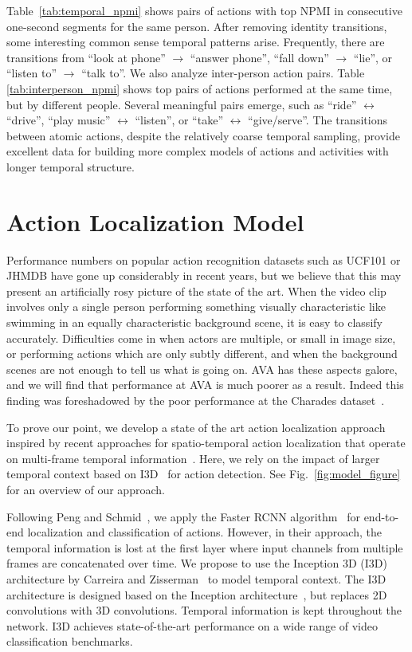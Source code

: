 \documentclass[10pt,twocolumn,letterpaper]{article}
\begin{document}
Table~\ref{tab:temporal_npmi} shows pairs of actions with top NPMI in consecutive one-second segments for the same person. After removing identity transitions, some interesting common sense temporal patterns arise. Frequently, there are transitions from ``look at phone''  $\rightarrow$ ``answer phone'', ``fall down''  $\rightarrow$ ``lie'', or ``listen to''  $\rightarrow$ ``talk to''.  We also analyze inter-person action pairs. Table \ref{tab:interperson_npmi} shows top pairs of actions performed at the same time, but by different people. Several meaningful pairs emerge, such as ``ride'' $\leftrightarrow$ ``drive'', ``play music'' $\leftrightarrow$ ``listen'', or ``take'' $\leftrightarrow$ ``give/serve''. The transitions between atomic actions, despite the relatively coarse temporal sampling, provide excellent data for building more complex models of actions and activities with longer temporal structure.
\vspace{-1em} 
\section{Action Localization Model} 
\label{sec:I3D}

Performance numbers on popular action recognition datasets such as UCF101 or JHMDB have gone up considerably in recent years, but we believe that this may present an artificially rosy picture of the state of the art. When the video clip involves only a single person performing something visually characteristic like swimming in an equally characteristic background scene, it is easy to classify accurately. Difficulties come in when actors are multiple, or small in image size, or performing actions which are only subtly different, and when the background scenes are not enough to tell us what is going on. AVA has these aspects galore, and we will find that performance at AVA is much poorer as a result. Indeed this finding was foreshadowed by the poor performance at the Charades dataset~\cite{charades2016}.

To prove our point, we develop a state of the art action localization approach inspired by recent approaches for spatio-temporal action localization that operate on multi-frame temporal information~\cite{T_CNN_iccv17,tubelets_iccv17}. Here, we rely on the impact of larger temporal context based on I3D~\cite{i3d_cvpr17} for action detection. See Fig.~\ref{fig:model_figure} for an overview of our approach. 

Following Peng and Schmid~\cite{peng2016multi}, we apply the Faster RCNN algorithm~\cite{ren2015faster} for end-to-end localization and classification of actions. However, in their approach, the temporal information is lost at the first layer where input channels from multiple frames are concatenated over time. We propose to use the Inception 3D (I3D) architecture by Carreira and Zisserman~\cite{i3d_cvpr17} to model temporal context. The I3D architecture is designed based on the Inception architecture~\cite{szegedy2015rethinking}, but replaces 2D convolutions with 3D convolutions. Temporal information is kept throughout the network. I3D achieves state-of-the-art performance on a wide range of video classification benchmarks.
\end{document}
